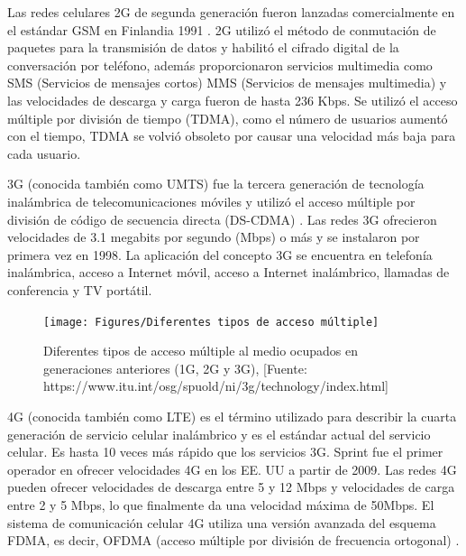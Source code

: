 Las redes celulares 2G de segunda generación fueron lanzadas comercialmente en el estándar GSM en Finlandia 1991 \parencite{Nair2018}. 2G utilizó el método de conmutación de paquetes para la transmisión de datos y habilitó el cifrado digital de la conversación por teléfono, además proporcionaron servicios multimedia como SMS (Servicios de mensajes cortos) MMS (Servicios de mensajes multimedia) y las velocidades de descarga y carga fueron de hasta 236 Kbps. Se utilizó el acceso múltiple por división de tiempo (TDMA), como el número de usuarios aumentó con el tiempo, TDMA se volvió obsoleto por causar una velocidad más baja para cada usuario.\newline

3G (conocida también como UMTS) fue la tercera generación de tecnología inalámbrica de telecomunicaciones móviles y utilizó el acceso múltiple por división de código de secuencia directa (DS-CDMA) \parencite{Nair2018}. Las redes 3G ofrecieron velocidades de 3.1 megabits por segundo (Mbps) o más y se instalaron por primera vez en 1998. La aplicación del concepto 3G se encuentra en telefonía inalámbrica, acceso a Internet móvil, acceso a Internet inalámbrico, llamadas de conferencia y TV portátil.\newline

\begin{figure}[th]
\centering
\texttt{[image: Figures/Diferentes tipos de acceso múltiple]}
\decoRule
\caption[Diferentes tipos de acceso múltiple al medio ocupados en generaciones anteriores (1G, 2G y 3G)]{Diferentes tipos de acceso múltiple al medio ocupados en generaciones anteriores (1G, 2G y 3G), [Fuente: https://www.itu.int/osg/spuold/ni/3g/technology/index.html]}
\label{fig:MAs}
\end{figure}

4G (conocida también como LTE) es el término utilizado para describir la cuarta generación de servicio celular inalámbrico y es el estándar actual del servicio celular. Es hasta 10 veces más rápido que los servicios 3G. Sprint fue el primer operador en ofrecer velocidades 4G en los EE. UU a partir de 2009. Las redes 4G pueden ofrecer velocidades de descarga entre 5 y 12 Mbps y velocidades de carga entre 2 y 5 Mbps, lo que finalmente da una velocidad máxima de 50Mbps. El sistema de comunicación celular 4G utiliza una versión avanzada del esquema FDMA, es decir, OFDMA (acceso múltiple por división de frecuencia ortogonal) \parencite{Nair2018}.\newline



